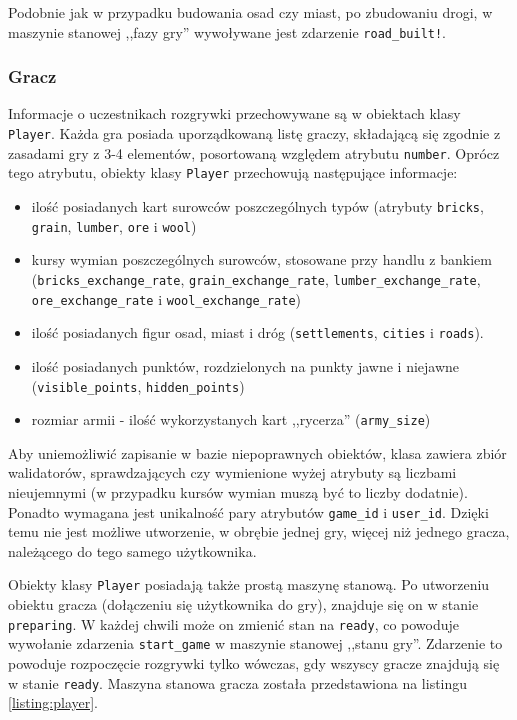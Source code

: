 \documentclass[a4paper,12pt]{article}
\begin{document}
Podobnie jak w przypadku budowania osad czy miast, po zbudowaniu
drogi, w maszynie stanowej ,,fazy gry'' wywoływane jest zdarzenie
\texttt{road\_built!}.

\subsubsection{Gracz}
Informacje o uczestnikach rozgrywki przechowywane są w obiektach klasy
\texttt{Player}. Każda gra posiada uporządkowaną listę graczy,
składającą się zgodnie z zasadami gry z 3-4 elementów, posortowaną
względem atrybutu \texttt{number}. Oprócz tego atrybutu, obiekty klasy
\texttt{Player} przechowują następujące informacje:

\begin{itemize}
\item ilość posiadanych kart surowców poszczególnych typów (atrybuty
  \texttt{bricks}, \texttt{grain}, \texttt{lumber}, \texttt{ore} i
  \texttt{wool})
\item kursy wymian poszczególnych surowców, stosowane przy handlu z
  bankiem (\texttt{bricks\_exchange\_rate},
  \texttt{grain\_exchange\_rate}, \texttt{lumber\_exchange\_rate},
  \texttt{ore\_exchange\_rate} i \texttt{wool\_exchange\_rate})
\item ilość posiadanych figur osad, miast i dróg
  (\texttt{settlements}, \texttt{cities} i \texttt{roads}).
\item ilość posiadanych punktów, rozdzielonych na punkty jawne i
  niejawne (\texttt{visible\_points}, \texttt{hidden\_points})
\item rozmiar armii - ilość wykorzystanych kart ,,rycerza''
  (\texttt{army\_size})
\end{itemize}

Aby uniemożliwić zapisanie w bazie niepoprawnych obiektów, klasa
zawiera zbiór walidatorów, sprawdzających czy wymienione wyżej
atrybuty są liczbami nieujemnymi (w przypadku kursów wymian muszą być
to liczby dodatnie). Ponadto wymagana jest unikalność pary atrybutów
\texttt{game\_id} i \texttt{user\_id}. Dzięki temu nie jest możliwe
utworzenie, w obrębie jednej gry, więcej niż jednego gracza,
należącego do tego samego użytkownika.

Obiekty klasy \texttt{Player} posiadają także prostą maszynę
stanową. Po utworzeniu obiektu gracza (dołączeniu się użytkownika do
gry), znajduje się on w stanie \texttt{preparing}. W każdej chwili
może on zmienić stan na \texttt{ready}, co powoduje wywołanie
zdarzenia \texttt{start\_game} w maszynie stanowej ,,stanu
gry''. Zdarzenie to powoduje rozpoczęcie rozgrywki tylko wówczas, gdy
wszyscy gracze znajdują się w stanie \texttt{ready}. Maszyna stanowa
gracza została przedstawiona na listingu \ref{listing:player}.
\end{document}
